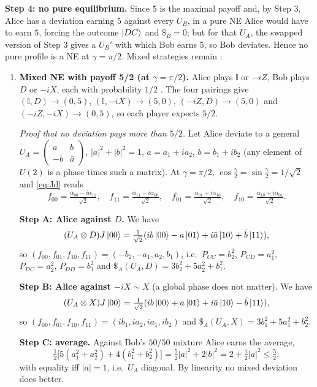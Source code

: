 \documentclass[11pt,a4paper]{article}
\begin{document}
\textbf{Step 4: no pure equilibrium.} Since $5$ is the maximal payoff and, by Step 3, Alice has a deviation earning $5$ against every $U_B$, in a pure NE Alice would have to earn $5$, forcing the outcome $\ket{DC}$ and $\$_B=0$; but for that $U_A$, the swapped version of Step 3 gives a $U_B'$ with which Bob earns $5$, so Bob deviates. Hence no pure profile is a NE at $\gamma=\pi/2$. Mixed strategies remain \cite{ew2000}:
\begin{enumerate}
\item \textbf{Mixed NE with payoff 5/2 (at $\gamma=\pi/2$).} Alice plays $\mathbb{I}$ or $-iZ$, Bob plays $D$ or $-iX$, each with probability $1/2$ \cite{ew2000}. The four pairings give $(\mathbb I,D)\to(0,5)$, $(\mathbb I,-iX)\to(5,0)$, $(-iZ,D)\to(5,0)$ and $(-iZ,-iX)\to(0,5)$, so each player expects $5/2$.

\emph{Proof that no deviation pays more than $5/2$.} Let Alice deviate to a general $U_A=\begin{pmatrix}a&b\\-\bar b&\bar a\end{pmatrix}$, $|a|^2+|b|^2=1$, $a=a_1+ia_2$, $b=b_1+ib_2$ (any element of $U(2)$ is a phase times such a matrix). At $\gamma=\pi/2$, $\cos\frac\gamma2=\sin\frac\gamma2=1/\sqrt2$ and \cref{eq:Jd} reads
\[
f_{00}=\tfrac{\alpha_{00}-i\alpha_{11}}{\sqrt2},\quad f_{11}=\tfrac{\alpha_{11}-i\alpha_{00}}{\sqrt2},\quad f_{01}=\tfrac{\alpha_{01}+i\alpha_{10}}{\sqrt2},\quad f_{10}=\tfrac{\alpha_{10}+i\alpha_{01}}{\sqrt2}.
\]

\textbf{Step A: Alice against $D$.} We have
\[
(U_A\otimes D)J\ket{00}=\tfrac1{\sqrt2}(ib\ket{00}-a\ket{01}+i\bar a\ket{10}+\bar b\ket{11}),
\]
so $(f_{00},f_{01},f_{10},f_{11})=(-b_2,-a_1,a_2,b_1)$, i.e.\ $P_{CC}=b_2^2$, $P_{CD}=a_1^2$, $P_{DC}=a_2^2$, $P_{DD}=b_1^2$ and $\$_A(U_A,D)=3b_2^2+5a_2^2+b_1^2$.

\textbf{Step B: Alice against $-iX\sim X$} (a global phase does not matter). We have
\[
(U_A\otimes X)J\ket{00}=\tfrac1{\sqrt2}(ib\ket{00}+a\ket{01}+i\bar a\ket{10}-\bar b\ket{11}),
\]
so $(f_{00},f_{01},f_{10},f_{11})=(ib_1,ia_2,ia_1,ib_2)$ and $\$_A(U_A,X)=3b_1^2+5a_1^2+b_2^2$.

\textbf{Step C: average.} Against Bob's $50/50$ mixture Alice earns the average,
\[
\tfrac12\big[5(a_1^2+a_2^2)+4(b_1^2+b_2^2)\big]=\tfrac52|a|^2+2|b|^2=2+\tfrac12|a|^2\le\tfrac52,
\]
with equality iff $|a|=1$, i.e.\ $U_A$ diagonal. By linearity no mixed deviation does better.


\end{enumerate}
\end{document}
